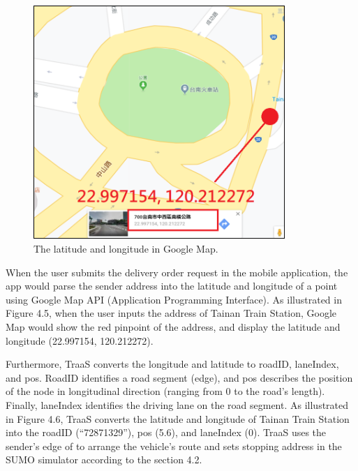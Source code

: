 \documentclass[12pt]{ksthesis}
\begin{document}
\begin{thesis}
{\begin{figure}[H]
\centering
\includegraphics[width=0.85\textwidth]{./Thesis_figures/F4-5_GPS_googleMap.PNG}
\caption{\large The latitude and longitude in Google Map.}
\vspace{0.5cm}
\label{Fig:GPS_in_GoggleMap}
\end{figure}


When the user submits the delivery order request in the mobile application, the app would parse the sender address into the latitude and longitude of a point using Google Map API (Application Programming Interface).
As illustrated in Figure 4.5, when the user inputs the address of Tainan Train Station, Google Map would show the red pinpoint of the address, and display the latitude and longitude (22.997154, 120.212272).

Furthermore, TraaS converts the longitude and latitude to roadID, laneIndex, and pos. RoadID identifies a road segment (edge), and pos describes the position of the node in longitudinal direction (ranging from 0 to the road's length). Finally, laneIndex identifies the driving lane on the road segment.
As illustrated in Figure 4.6, TraaS converts the latitude and longitude of Tainan Train Station into the roadID (“72871329”), pos (5.6), and laneIndex (0).
TraaS uses the sender’s edge of to arrange the vehicle’s route and sets stopping address in the SUMO simulator according to the section 4.2.

}
\end{thesis}
\end{document}
